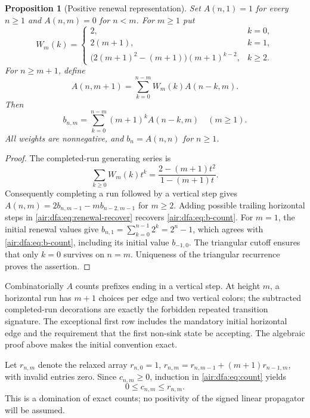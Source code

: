 \documentclass[11pt,letterpaper]{article}
\numberwithin{equation}{section}
\newtheorem{proposition}[theorem]{Proposition}
\theoremstyle{remark}
\begin{document}
\begin{proposition}[Positive renewal representation]\label{air:dfa:prop:renewal}
Set $A(n,1)=1$ for every $n\ge1$ and $A(n,m)=0$ for $n<m$. For $m\ge1$
put
\begin{equation}\label{air:dfa:eq:run-weights}
W_m(k)=\begin{cases}
2,&k=0,\\
2(m+1),&k=1,\\
\bigl(2(m+1)^2-(m+1)\bigr)(m+1)^{k-2},&k\ge2.
\end{cases}
\end{equation}
For $n\ge m+1$, define
\[
A(n,m+1)=\sum_{k=0}^{n-m}W_m(k)A(n-k,m).
\]
Then
\begin{equation}\label{air:dfa:eq:renewal-recover}
b_{n,m}=\sum_{k=0}^{n-m}(m+1)^kA(n-k,m)\quad(m\ge1).
\end{equation}
All weights are nonnegative, and $b_n=A(n,n)$ for $n\ge1$.
\end{proposition}
\begin{proof}
The completed-run generating series is
\[
\sum_{k\ge0}W_m(k)t^k=\frac{2-(m+1)t^2}{1-(m+1)t}.
\]
Consequently completing a run followed by a vertical step gives
$A(n,m)=2b_{n,m-1}-m b_{n-2,m-1}$ for $m\ge2$.
Adding possible trailing horizontal steps in \eqref{air:dfa:eq:renewal-recover}
recovers \eqref{air:dfa:eq:b-count}. For $m=1$, the initial renewal values give
$b_{n,1}=\sum_{k=0}^{n-1}2^k=2^n-1$, which agrees with
\eqref{air:dfa:eq:b-count}, including its initial value $b_{-1,0}$.
The triangular cutoff ensures that only $k=0$ survives on $n=m$.
Uniqueness of the triangular recurrence proves the assertion.
\end{proof}
Combinatorially $A$ counts prefixes ending in a vertical step. At height
$m$, a horizontal run has $m+1$ choices per edge and two vertical colors;
the subtracted completed-run decorations are exactly the forbidden repeated
transition signature. The exceptional first row includes the mandatory
initial horizontal edge and the requirement that the first non-sink state
be accepting. The algebraic proof above makes the initial convention exact.

Let $r_{n,m}$ denote the relaxed array
$r_{n,0}=1$, $r_{n,m}=r_{n,m-1}+(m+1)r_{n-1,m}$, with invalid entries zero.
Since $c_{n,m}\ge0$, induction in \eqref{air:dfa:eq:count} yields
\begin{equation}\label{air:dfa:eq:domination}
0\le c_{n,m}\le r_{n,m}.
\end{equation}
This is a domination of exact counts; no positivity of the signed linear
propagator will be assumed.
\end{document}
